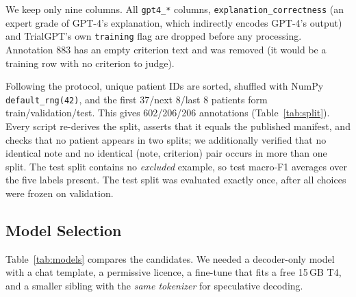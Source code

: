 \documentclass[conference]{IEEEtran}
\begin{document}
We keep only nine columns. All \texttt{gpt4\_*} columns, \texttt{explanation\_correctness} (an expert grade of GPT-4's explanation, which indirectly encodes GPT-4's output) and TrialGPT's own \texttt{training} flag are dropped before any processing. Annotation 883 has an empty criterion text and was removed (it would be a training row with no criterion to judge).

Following the protocol, unique patient IDs are sorted, shuffled with NumPy \texttt{default\_rng(42)}, and the first 37/next 8/last 8 patients form train/validation/test. This gives 602/206/206 annotations (Table~\ref{tab:split}). Every script re-derives the split, asserts that it equals the published manifest, and checks that no patient appears in two splits; we additionally verified that no identical note and no identical (note, criterion) pair occurs in more than one split. The test split contains no \emph{excluded} example, so test macro-F1 averages over the five labels present. The test split was evaluated exactly once, after all choices were frozen on validation.

\begin{table}[t]
\centering
\caption{Patient-grouped split (seed 42) and expert label distribution.}
\label{tab:split}
\footnotesize
{}
\end{table}

\subsection{Model Selection}
Table~\ref{tab:models} compares the candidates. We needed a decoder-only model with a chat template, a permissive licence, a fine-tune that fits a free 15\,GB T4, and a smaller sibling with the \emph{same tokenizer} for speculative decoding.

\begin{table}[t]
\centering
\caption{Open-weight decoder candidates (official model cards). KV = 16-bit key/value cache per 1,000 tokens.}
\label{tab:models}
\end{table}
\end{document}
